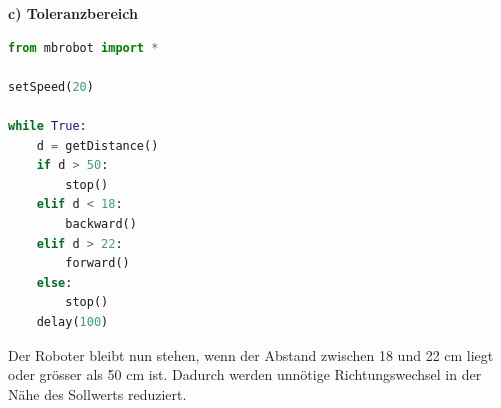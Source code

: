 \begin{myexercise}
\begin{myanswer}




        \textbf{c) Toleranzbereich}

        \begin{lstlisting}[language=Python]
from mbrobot import *

setSpeed(20)

while True:
    d = getDistance()
    if d > 50:
        stop()
    elif d < 18:
        backward()
    elif d > 22:
        forward()
    else:
        stop()
    delay(100)
        \end{lstlisting}

        Der Roboter bleibt nun stehen, wenn der Abstand
        zwischen 18 und 22 cm liegt oder grösser als
        50 cm ist. Dadurch werden unnötige
        Richtungswechsel in der Nähe des Sollwerts
        reduziert.
    \end{myanswer}
\end{myexercise}



